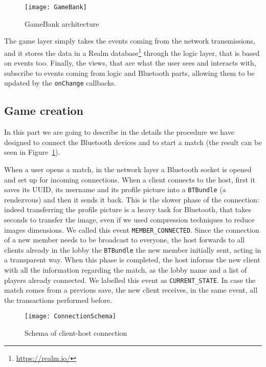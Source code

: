 \begin{figure}[t]
 \centering
 \texttt{[image: GameBank]}
 \caption{GameBank architecture}
 \label{fig:gbArchitecture}
\end{figure}

The game layer simply takes the events coming from the network transmissions, 
and it stores the data in a Realm database\footnote{\url{https://realm.io/}} 
through the logic layer, that is based on events too. Finally, the views, that 
are what the user sees and interacts with, subscribe to events coming from 
logic and Bluetooth parts, allowing them to be updated by the \texttt{onChange} 
callbacks.

\subsection{Game creation}

In this part we are going to describe in the details the procedure we have 
designed to connect the Bluetooth devices and to start a match (the result can 
be seen in Figure~\hyperref[fig:matchmaking]{1}).

When a user opens a match, in the network layer a Bluetooth socket is opened 
and set up for incoming connections. When a client connects to the host, 
first it saves its UUID, its username and its profile picture into a 
\texttt{BTBundle} (a rendezvous) and then it sends it back.
This is the slower phase of the connection: indeed transferring the profile 
picture is a heavy task for Bluetooth, that takes seconds to transfer the image, 
even if we used compression techniques to reduce images dimensions. We called 
this event \texttt{MEMBER\_CONNECTED}. Since the connection of a new member 
needs to be broadcast to everyone, the host forwards to all clients 
already in the lobby the \texttt{BTBundle} the new member initially sent, acting 
in a transparent way. When this phase is completed, the host informs the new 
client with all the information regarding the match, as the lobby name and a 
list of players already connected. We labelled this event as 
\texttt{CURRENT\_STATE}. In case the match comes from a previous save, the new 
client receives, in the same event, all the transactions performed before.

\begin{figure}[t]
 \centering
 \texttt{[image: ConnectionSchema]}
 \caption{Schema of client-host connection}
 \label{fig:gbConnectionSchema}
\end{figure}


